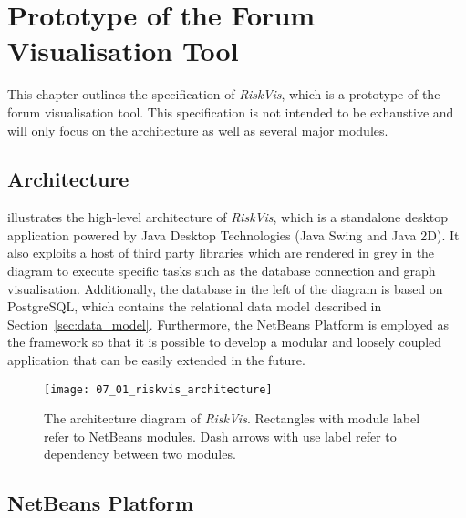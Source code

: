 \chapter{Prototype of the Forum Visualisation Tool} \label{Chapter:Prototype}

This chapter outlines the specification of \emph{RiskVis}, which is a prototype of the forum visualisation tool. This specification is not intended to be exhaustive and will only focus on the architecture as well as several major modules.

\section{Architecture}

 illustrates the high-level architecture of \emph{RiskVis}, which is a standalone desktop application powered by Java Desktop Technologies (Java Swing and Java 2D). It also exploits a host of third party libraries which are rendered in grey in the diagram to execute specific tasks such as the database connection and graph visualisation. Additionally, the database in the left of the diagram is based on PostgreSQL, which contains the relational data model described in Section~\ref{sec:data_model}. Furthermore, the NetBeans Platform is employed as the framework so that it is possible to develop a modular and loosely coupled application that can be easily extended in the future.

\begin{figure}[!htb]
  \centering
  \texttt{[image: 07\_01\_riskvis\_architecture]}
  \caption{The architecture diagram of \emph{RiskVis}. Rectangles with module label refer to NetBeans modules. Dash arrows with use label refer to dependency between two modules.}
  \label{Figure:07_01}
\end{figure}

\section{NetBeans Platform}

